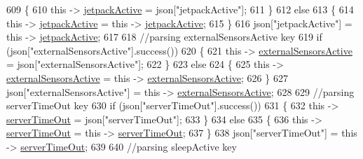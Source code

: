 \begin{DoxyCode}
609             \{
610                 \textcolor{keyword}{this} -> \hyperlink{classCoolBoard_a9be03a913d26e558328935ca3b59a75e}{jetpackActive} = json[\textcolor{stringliteral}{"jetpackActive"}];
611             \}
612             \textcolor{keywordflow}{else}
613             \{
614                 \textcolor{keyword}{this} -> \hyperlink{classCoolBoard_a9be03a913d26e558328935ca3b59a75e}{jetpackActive} = \textcolor{keyword}{this} -> \hyperlink{classCoolBoard_a9be03a913d26e558328935ca3b59a75e}{jetpackActive};
615             \}
616             json[\textcolor{stringliteral}{"jetpackActive"}] = \textcolor{keyword}{this} -> \hyperlink{classCoolBoard_a9be03a913d26e558328935ca3b59a75e}{jetpackActive};
617 
618             \textcolor{comment}{//parsing externalSensorsActive key}
619             \textcolor{keywordflow}{if} (json[\textcolor{stringliteral}{"externalSensorsActive"}].success())
620             \{
621                 \textcolor{keyword}{this} -> \hyperlink{classCoolBoard_a638b00b76aeb819ecfd4c10b8cdd7bb7}{externalSensorsActive} = json[\textcolor{stringliteral}{"externalSensorsActive"}];
622             \}
623             \textcolor{keywordflow}{else}
624             \{
625                 \textcolor{keyword}{this} -> \hyperlink{classCoolBoard_a638b00b76aeb819ecfd4c10b8cdd7bb7}{externalSensorsActive} = \textcolor{keyword}{this} -> 
      \hyperlink{classCoolBoard_a638b00b76aeb819ecfd4c10b8cdd7bb7}{externalSensorsActive};
626             \}
627             json[\textcolor{stringliteral}{"externalSensorsActive"}] = \textcolor{keyword}{this} -> \hyperlink{classCoolBoard_a638b00b76aeb819ecfd4c10b8cdd7bb7}{externalSensorsActive};
628 
629             \textcolor{comment}{//parsing serverTimeOut key}
630             \textcolor{keywordflow}{if} (json[\textcolor{stringliteral}{"serverTimeOut"}].success())
631             \{
632                 \textcolor{keyword}{this} -> \hyperlink{classCoolBoard_a7a8d8d3d316220cdd049cd63c1aa8fe6}{serverTimeOut} = json[\textcolor{stringliteral}{"serverTimeOut"}];
633             \}
634             \textcolor{keywordflow}{else}
635             \{
636                 \textcolor{keyword}{this} -> \hyperlink{classCoolBoard_a7a8d8d3d316220cdd049cd63c1aa8fe6}{serverTimeOut} = \textcolor{keyword}{this} -> \hyperlink{classCoolBoard_a7a8d8d3d316220cdd049cd63c1aa8fe6}{serverTimeOut};
637             \}
638             json[\textcolor{stringliteral}{"serverTimeOut"}] = \textcolor{keyword}{this} -> \hyperlink{classCoolBoard_a7a8d8d3d316220cdd049cd63c1aa8fe6}{serverTimeOut};
639             
640             \textcolor{comment}{//parsing sleepActive key}

\end{DoxyCode}
